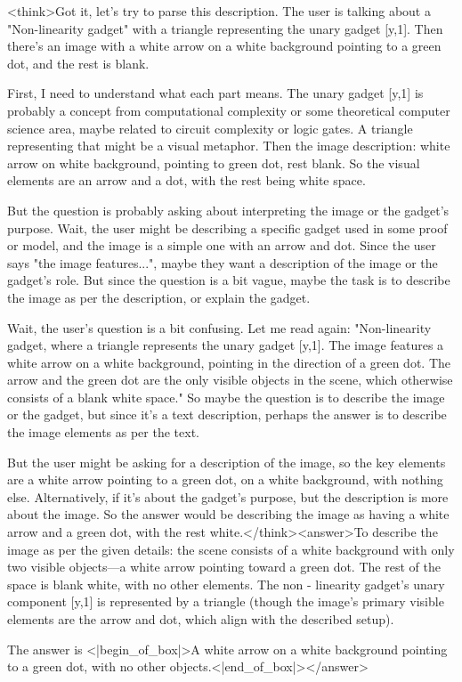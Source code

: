 <think>Got it, let's try to parse this description. The user is talking about a "Non-linearity gadget" with a triangle representing the unary gadget [y,1]. Then there's an image with a white arrow on a white background pointing to a green dot, and the rest is blank. 

First, I need to understand what each part means. The unary gadget [y,1] is probably a concept from computational complexity or some theoretical computer science area, maybe related to circuit complexity or logic gates. A triangle representing that might be a visual metaphor. Then the image description: white arrow on white background, pointing to green dot, rest blank. So the visual elements are an arrow and a dot, with the rest being white space.

But the question is probably asking about interpreting the image or the gadget's purpose. Wait, the user might be describing a specific gadget used in some proof or model, and the image is a simple one with an arrow and dot. Since the user says "the image features...", maybe they want a description of the image or the gadget's role. But since the question is a bit vague, maybe the task is to describe the image as per the description, or explain the gadget.

Wait, the user's question is a bit confusing. Let me read again: "Non-linearity gadget, where a triangle represents the unary gadget [y,1]. The image features a white arrow on a white background, pointing in the direction of a green dot. The arrow and the green dot are the only visible objects in the scene, which otherwise consists of a blank white space." So maybe the question is to describe the image or the gadget, but since it's a text description, perhaps the answer is to describe the image elements as per the text.

But the user might be asking for a description of the image, so the key elements are a white arrow pointing to a green dot, on a white background, with nothing else. Alternatively, if it's about the gadget's purpose, but the description is more about the image. So the answer would be describing the image as having a white arrow and a green dot, with the rest white.</think><answer>To describe the image as per the given details: the scene consists of a white background with only two visible objects—a white arrow pointing toward a green dot. The rest of the space is blank white, with no other elements. The non - linearity gadget’s unary component [y,1] is represented by a triangle (though the image’s primary visible elements are the arrow and dot, which align with the described setup).  

The answer is <|begin_of_box|>A white arrow on a white background pointing to a green dot, with no other objects.<|end_of_box|></answer>